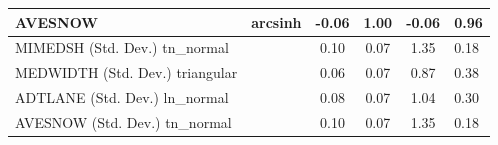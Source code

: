 \begin{table}
\begin{center}
\begin{tabular}{|l|l|c|c|c|l|}
			\hline
			AVESNOW & arcsinh & -0.06 & 1.00 & -0.06 & 0.96 \\
			\hline
			MIMEDSH (Std. Dev.) tn_normal &  & 0.10 & 0.07 & 1.35 & 0.18 \\
			\hline
			MEDWIDTH (Std. Dev.) triangular &  & 0.06 & 0.07 & 0.87 & 0.38 \\
			\hline
			ADTLANE (Std. Dev.) ln_normal &  & 0.08 & 0.07 & 1.04 & 0.30 \\
			\hline
			AVESNOW (Std. Dev.) tn_normal &  & 0.10 & 0.07 & 1.35 & 0.18 \\
			\hline
		\end{tabular}
	\end{center}
\end{table}